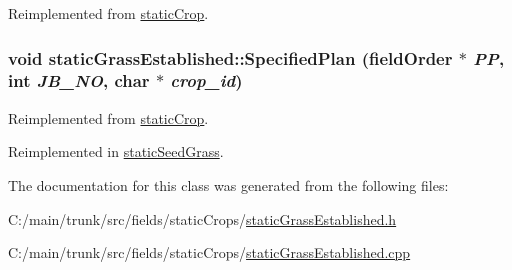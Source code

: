 Reimplemented from \hyperlink{classstatic_crop_a4d3d767f569f48eb68ffa76822302467}{staticCrop}.\hypertarget{classstatic_grass_established_af5cde9b824bca1b7ffef27ecb92d4b8b}{
\subsubsection[{SpecifiedPlan}]{\setlength{\rightskip}{0pt plus 5cm}void staticGrassEstablished::SpecifiedPlan ({\bf fieldOrder} $\ast$ {\em PP}, \/  int {\em JB\_\-NO}, \/  char $\ast$ {\em crop\_\-id})}}
\label{classstatic_grass_established_af5cde9b824bca1b7ffef27ecb92d4b8b}


Reimplemented from \hyperlink{classstatic_crop_af19d8a1e4f4833325f6712c22ede8b45}{staticCrop}.

Reimplemented in \hyperlink{classstatic_seed_grass_a816b9db700be83fb80b143e80c63286e}{staticSeedGrass}.

The documentation for this class was generated from the following files:\begin{DoxyCompactItemize}
\item 
C:/main/trunk/src/fields/staticCrops/\hyperlink{static_grass_established_8h}{staticGrassEstablished.h}\item 
C:/main/trunk/src/fields/staticCrops/\hyperlink{static_grass_established_8cpp}{staticGrassEstablished.cpp}\end{DoxyCompactItemize}
